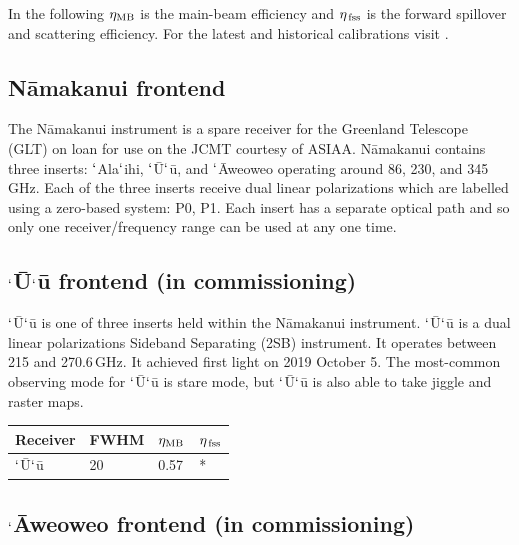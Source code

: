 \documentclass[11pt,oneside,chapters]{starlink}
\newcommand{\uarcs}{\hspace{-0.27em}\arcsec\hspace{-0.07em}}
\newcommand{\uarcs}{$''$}
\begin{document}
In the following $\eta_{\textnormal{MB}}$ is the main-beam efficiency and
$\eta_{\textnormal{\,fss}}$ is the forward spillover and scattering efficiency.
For the latest and historical calibrations visit
.



\subsection{N\=amakanui frontend}

The N\=amakanui instrument is a spare receiver for the Greenland
Telescope (GLT) on loan for use on the JCMT courtesy of ASIAA.
N\=amakanui contains three inserts: $`$Ala$`$ihi, $`$\=U$`$\=u, and
$`$\=Aweoweo operating around 86, 230, and 345\,GHz. Each of the three
inserts receive dual linear polarizations which are labelled using a
zero-based system: P0, P1. Each insert has a separate optical path and
so only one receiver/frequency range can be used at any one time.

\subsection{$`$\=U$`$\=u frontend (in commissioning)}

$`$\=U$`$\=u is one of three inserts held within the N\=amakanui
instrument. $`$\=U$`$\=u is a dual linear polarizations Sideband
Separating (2SB) instrument. It operates between 215 and 270.6\,GHz.
It achieved first light on 2019 October 5.  The most-common observing
mode for $`$\=U$`$\=u is stare mode, but $`$\=U$`$\=u is also able to
take jiggle and raster maps.

\begin{table}[h!]
\begin{center}
\begin{tabular}{|p{1.5cm}|p{1.2cm}|p{0.8cm}|p{0.8cm}|}
\hline
Receiver &FWHM & $\eta_{\textnormal{MB}}$ & $\eta_{\textnormal{\,fss}}$\\
\hline
$`$\=U$`$\=u&20\uarcs&0.57 & *\\
\hline
\end{tabular}
\end{center}
\end{table}


\subsection{$`$\=Aweoweo frontend (in commissioning)}
\end{document}
